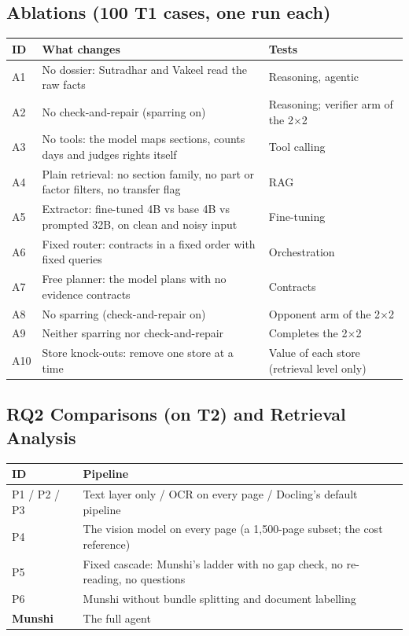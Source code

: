 \documentclass[10pt,a4paper]{article}
\begin{document}
\subsection{Ablations (100 T1 cases, one run each)}

{\small
\begin{xltabular}{\linewidth}{@{}>{\raggedright\arraybackslash{}\hsize}X>{\raggedright\arraybackslash{}\hsize}X>{\raggedright\arraybackslash{}\hsize}X@{}}
\toprule
\textbf{ID} & \textbf{What changes} & \textbf{Tests} \\
\midrule
\endhead
A1 & No dossier: Sutradhar and Vakeel read the raw facts & Reasoning, agentic \\
A2 & No check-and-repair (sparring on) & Reasoning; verifier arm of the 2$\times$2 \\
A3 & No tools: the model maps sections, counts days and judges rights itself & Tool calling \\
A4 & Plain retrieval: no section family, no part or factor filters, no transfer flag & RAG \\
A5 & Extractor: fine-tuned 4B vs base 4B vs prompted 32B, on clean and noisy input & Fine-tuning \\
A6 & Fixed router: contracts in a fixed order with fixed queries & Orchestration \\
A7 & Free planner: the model plans with no evidence contracts & Contracts \\
A8 & No sparring (check-and-repair on) & Opponent arm of the 2$\times$2 \\
A9 & Neither sparring nor check-and-repair & Completes the 2$\times$2 \\
A10 & Store knock-outs: remove one store at a time & Value of each store (retrieval level only) \\
\bottomrule
\end{xltabular}}

\subsection{RQ2 Comparisons (on T2) and Retrieval Analysis}

{\small
\begin{xltabular}{\linewidth}{@{}>{\raggedright\arraybackslash{}\hsize}X>{\raggedright\arraybackslash{}\hsize}X@{}}
\toprule
\textbf{ID} & \textbf{Pipeline} \\
\midrule
\endhead
P1 / P2 / P3 & Text layer only / OCR on every page / Docling's default pipeline \\
P4 & The vision model on every page (a 1,500-page subset; the cost reference) \\
P5 & Fixed cascade: Munshi's ladder with no gap check, no re-reading, no questions \\
P6 & Munshi without bundle splitting and document labelling \\
\textbf{Munshi} & The full agent \\
\bottomrule
\end{xltabular}}
\end{document}
